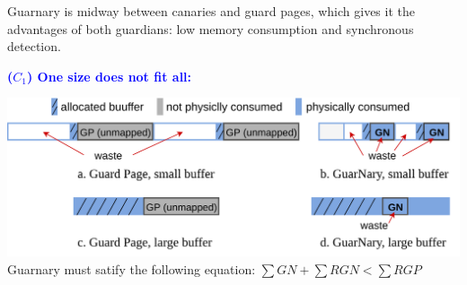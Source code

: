 \documentclass[landscape,a0paper,fontscale=0.3]{baposter} %
\begin{document}
\begin{poster}
{\begin{multicols}{2}
    \end{multicols}
}



{
\renewcommand{\section}[2]{\vskip 0.05em} %
\nocite{*} %
\small{ %

}
}


{
    Guarnary is midway between canaries and guard pages, which gives it the advantages of both guardians: low memory consumption and synchronous detection.
    \begin{multicols}{2}
        \textcolor{blue}{\textbf{($C_1$) One size does not fit all:}} 
        \begin{center}
            \includegraphics[width=\columnwidth]{figures/challenge1}
            Guarnary must satify the following equation: $\sum GN + \sum RGN < \sum RGP$
        \end{center}


\end{multicols}}
\end{poster}
\end{document}
